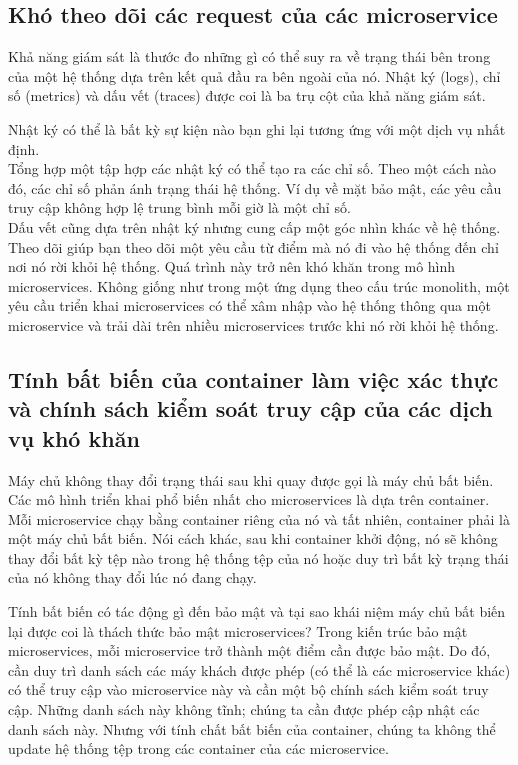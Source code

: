 \documentclass[12pt,a4paper]{report}
\begin{document}
		\subsection{Khó theo dõi các request của các microservice}
				{\hspace{0.6cm}Khả năng giám sát là thước đo những gì có thể suy ra về trạng thái bên trong của một hệ thống dựa trên kết quả đầu ra bên ngoài của nó. Nhật ký (logs), chỉ số (metrics) và dấu vết (traces) được coi là ba trụ cột của khả năng giám sát.\\}
				
				Nhật ký có thể là bất kỳ sự kiện nào bạn ghi lại tương ứng với một dịch vụ nhất định.\\
				
				Tổng hợp một tập hợp các nhật ký có thể tạo ra các chỉ số. Theo một cách nào đó, các chỉ số phản ánh trạng thái hệ thống. Ví dụ về mặt bảo mật, các yêu cầu truy cập không hợp lệ trung bình mỗi giờ là một chỉ số.\\
				
				Dấu vết cũng dựa trên nhật ký nhưng cung cấp một góc nhìn khác về hệ thống. Theo dõi giúp bạn theo dõi một yêu cầu từ điểm mà nó đi vào hệ thống đến chỉ nơi nó rời khỏi hệ thống. Quá trình này trở nên khó khăn trong mô hình microservices. Không giống như trong một ứng dụng theo cấu trúc monolith, một yêu cầu triển khai microservices có thể xâm nhập vào hệ thống thông qua một microservice và trải dài trên nhiều microservices trước khi nó rời khỏi hệ thống.			
		\subsection{Tính bất biến của container làm việc xác thực và chính sách kiểm soát truy cập của các dịch vụ khó khăn}
				{\hspace{0.6cm}Máy chủ không thay đổi trạng thái sau khi quay được gọi là máy chủ bất biến. Các mô hình triển khai phổ biến nhất cho microservices là dựa trên container. Mỗi microservice chạy bằng container riêng của nó và tất nhiên, container phải là một máy chủ bất biến. Nói cách khác, sau khi container khởi động, nó sẽ không thay đổi bất kỳ tệp nào trong hệ thống tệp của nó hoặc duy trì bất kỳ trạng thái của nó không thay đổi lúc nó đang chạy.\\}
				
				Tính bất biến có tác động gì đến bảo mật và tại sao khái niệm máy chủ bất biến lại được coi là thách thức bảo mật microservices? Trong kiến trúc bảo mật microservices, mỗi microservice trở thành một điểm cần được bảo mật. Do đó, cần duy trì danh sách các máy khách được phép (có thể là các microservice khác) có thể truy cập vào microservice này và cần một bộ chính sách kiểm soát truy cập. Những danh sách này không tĩnh; chúng ta cần được phép cập nhật các danh sách này. Nhưng với tính chất bất biến của container, chúng ta không thể update hệ thống tệp trong các container của các microservice.
\end{document}
